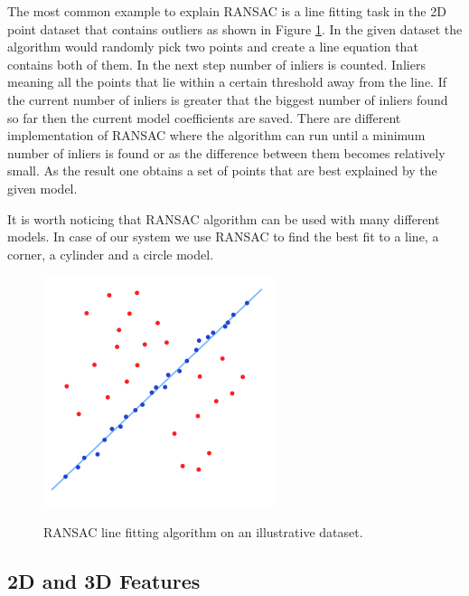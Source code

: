 The most common example to explain RANSAC is a line fitting task in the 2D point dataset that contains outliers as shown in Figure \ref{fig:ransac}. In the given dataset the algorithm would randomly pick two points and create a line equation that contains both of them. In the next step number of inliers is counted. Inliers meaning all the points that lie within a certain threshold away from the line. If the current number of inliers is greater that the biggest number of inliers found so far then the current model coefficients are saved. There are different implementation of RANSAC where the algorithm can run until a minimum number of inliers is found or as the difference between them becomes relatively small. As the result one obtains a set of points that are best explained by the given model.

It is worth noticing that RANSAC algorithm can be used with many different models. In case of our system we use RANSAC to find the best fit to a line, a corner, a cylinder and a circle model. 



\begin{figure}
\centering

{\includegraphics[width=0.3\columnwidth]{figures/ransac.png}}

\caption{RANSAC line fitting algorithm on an illustrative dataset.}
\label{fig:ransac}
\end{figure}



\subsection{2D and 3D Features}

